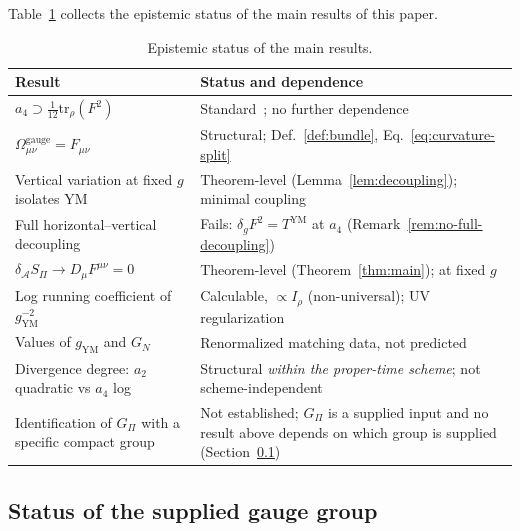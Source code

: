 \documentclass[12pt,a4paper]{article}
\theoremstyle{remark}
\theoremstyle{plain}
\theoremstyle{definition}
\begin{document}
      Table~\ref{tab:epistemic} collects the epistemic status
      of the main results of this paper.

      \begin{table}[h]
        \caption{Epistemic status of the main results.}
        \label{tab:epistemic}
        \centering
        \begin{tabularx}{\textwidth}{@{}>{\raggedright\arraybackslash}p{}X@{}}
          \toprule
          Result & Status and dependence \\
          \midrule
          $a_4 \supset \frac{1}{12}\mathrm{tr}_\rho(F^2)$
          & Standard~\cite{Vassilevich2003}; no further dependence \\
          $\Omega^{\mathrm{gauge}}_{\mu\nu} = F_{\mu\nu}$
          & Structural; Def.~\ref{def:bundle}, Eq.~\eqref{eq:curvature-split} \\
          Vertical variation at fixed $g$ isolates YM
          & Theorem-level (Lemma~\ref{lem:decoupling}); minimal coupling \\
          Full horizontal--vertical decoupling
          & Fails: $\delta_g F^2 = T^{\mathrm{YM}}$ at $a_4$
          (Remark~\ref{rem:no-full-decoupling}) \\
          $\delta_\mathcal{A} S_\Pi \to D_\mu F^{\mu\nu} = 0$
          & Theorem-level (Theorem~\ref{thm:main}); at fixed $g$ \\
          Log running coefficient of $g_{\mathrm{YM}}^{-2}$
          & Calculable, $\propto I_\rho$ (non-universal); UV regularization \\
          Values of $g_{\mathrm{YM}}$ and $G_N$
          & Renormalized matching data, not predicted \\
          Divergence degree: $a_2$ quadratic vs $a_4$ log
          & Structural \emph{within the proper-time scheme}; not scheme-independent \\
          Identification of $G_\Pi$ with a specific compact group
          & Not established; $G_\Pi$ is a supplied input and no result above depends
          on which group is supplied (Section~\ref{subsec:hcolor}) \\
          \bottomrule
        \end{tabularx}
      \end{table}

    \subsection{Status of the supplied gauge group}
      \label{subsec:hcolor}
\end{document}
